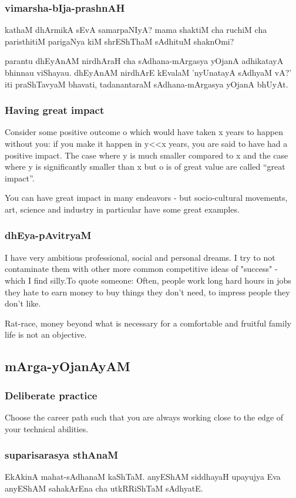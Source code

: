 \documentclass[oneside, article]{memoir}
\begin{document}
\subsubsection{vimarsha-bIja-prashnAH}
kathaM dhArmikA sEvA samarpaNIyA? mama shaktiM cha ruchiM cha paristhitiM parigaNya kiM shrEShThaM sAdhituM shaknOmi?

parantu dhEyAnAM nirdhAraH cha sAdhana-mArgasya yOjanA adhikatayA bhinnau viShayau. dhEyAnAM nirdhArE kEvalaM 'nyUnatayA sAdhyaM vA?' iti praShTavyaM bhavati, tadanantaraM sAdhana-mArgasya yOjanA bhUyAt.

\subsubsection{Having great impact}
Consider some positive outcome o which would have taken x years to happen without you: if you make it happen in y<<x years, you are said to have had a positive impact. The case where y is much smaller compared to x and the case where y is significantly smaller than x but o is of great value are called “great impact”.

You can have great impact in many endeavors - but socio-cultural movements, art, science and industry in particular have some great examples.

\subsubsection{dhEya-pAvitryaM}
I have very ambitious professional, social and personal dreams. I try to not contaminate them with other more common competitive ideas of "success" - which I find silly.To quote someone: Often, people work long hard hours in jobs they hate to earn money to buy things they don't need, to impress people they don't like.

Rat-race, money beyond what is necessary for a comfortable and fruitful family life is not an objective.

\subsection{mArga-yOjanAyAM}
\subsubsection{Deliberate practice}
Choose the career path such that you are always working close to the edge of your technical abilities.

\subsubsection{suparisarasya sthAnaM}
EkAkinA mahat-sAdhanaM kaShTaM. anyEShAM siddhayaH upayujya Eva anyEShAM sahakArEna cha utkRRiShTaM sAdhyatE.
\end{document}
